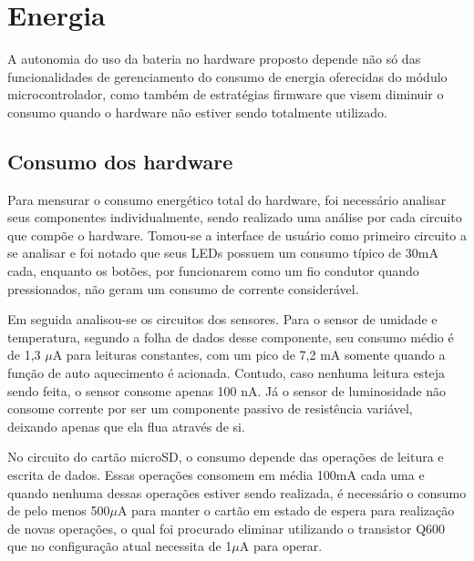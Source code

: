\section{Energia}

A autonomia do uso da bateria no hardware proposto depende não só das funcionalidades de gerenciamento do consumo de energia oferecidas do módulo microcontrolador, como também de estratégias firmware que visem diminuir o consumo quando o hardware não estiver sendo totalmente utilizado. 

\subsection{Consumo dos hardware}

Para mensurar o consumo energético total do hardware, foi necessário analisar seus componentes individualmente, sendo realizado uma análise por cada circuito que compõe o hardware. Tomou-se a interface de usuário como primeiro circuito a se analisar e foi notado que seus LEDs possuem um consumo típico de 30mA cada, enquanto os botões, por funcionarem como um fio condutor quando pressionados, não geram um consumo de corrente considerável. 

Em seguida analisou-se os circuitos dos sensores. Para o sensor de umidade e temperatura, segundo a folha de dados desse componente, seu consumo médio é de 1,3 $\mu$A para leituras constantes, com um pico de 7,2 mA somente quando a função de auto aquecimento é acionada. Contudo, caso nenhuma leitura esteja sendo feita, o sensor consome apenas 100 nA. Já o sensor de luminosidade não consome corrente por ser um componente passivo de resistência variável, deixando apenas que ela flua através de si.

No circuito do cartão microSD, o consumo depende das operações de leitura e escrita de dados. Essas operações consomem em média 100mA cada uma e quando nenhuma dessas operações estiver sendo realizada, é necessário o consumo de pelo menos 500$\mu$A para manter o cartão em estado de espera para realização de novas operações, o qual foi procurado eliminar utilizando o transistor Q600 que no configuração atual necessita de 1$\mu$A para operar.

